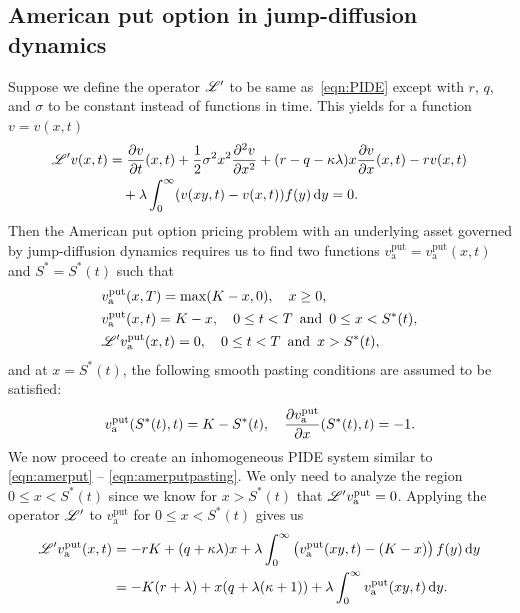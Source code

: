      \subsection{American put option in jump-diffusion dynamics}
     \label{sec:amerputJD}
     Suppose we define the operator $\mathscr L'$ to be same as~\eqref{eqn:PIDE} except with $r$, $q$, and $\sigma$ to be constant instead of functions in time. This yields for a function $v = v(x,t)$
   \begin{equation}
   	\label{eqn:PIDE2}
   	\begin{split}
   	\mathscr L'v(x,t) &= \frac{\partial v}{\partial t}(x,t) + \frac{1}{2}\sigma^2x^2\frac{\partial^2 v}{\partial x^2} + (r-q-\kappa\lambda)x\frac{\partial v}{\partial x}(x,t) - rv(x,t) \\
   	&{}\quad + \lambda\int_0^\infty (v(xy,t)-v(x,t))f(y) \, \mathrm d y = 0.
   	\end{split}
   \end{equation}
   Then the American put option pricing problem with an underlying asset governed by jump-diffusion dynamics requires us to find two functions $ v_{\text{a}}^{\text{put}} = v_{\text{a}}^{\text{put}}(x,t)$ and $S^* = S^*(t)$ such that
        \begin{equation}
        \label{eqn:amerputPIDE}
        \begin{split}
            &v_{\text{a}}^{\text{put}}(x,T) = \max(K-x,0), \quad x \geq 0, \\
            &v_{\text{a}}^{\text{put}}(x,t) = K-x, \quad 0 \leq t < T \enskip \text{and} \enskip 0 \leq x < S^*(t), \\
            &\mathscr{L'}v_{\text{a}}^{\text{put}}(x,t) = 0, \quad 0 \leq t < T \enskip \text{and} \enskip x > S^*(t),
        \end{split}
    \end{equation}
    and at $x = S^*(t)$, the following smooth pasting conditions are assumed to be satisfied:
    	\begin{equation}
    		\label{eqn:amerputPIDEsmc}
    		v_{\text{a}}^{\text{put}}(S^*(t),t) = K - S^*(t), \quad \frac{\partial v_{\text{a}}^{\text{put}}}{\partial x}(S^*(t),t) = -1.
    	\end{equation}
    	We now proceed to create an inhomogeneous PIDE system similar to \eqref{eqn:amerput} -- \eqref{eqn:amerputpasting}. We only need to analyze the region $0 \leq x < S^*(t)$ since we know for $x > S^*(t)$ that $\mathscr L' v_{\text{a}}^{\text{put}} = 0$. Applying the operator $\mathscr L'$ to $v_{\text{a}}^{\text{put}}$ for $0 \leq x < S^*(t)$ gives us
        \begin{align*}
            \mathscr L'v_{\text{a}}^{\text{put}}(x,t) &= -rK + (q+\kappa\lambda)x + \lambda\int_0^\infty \left( v_{\text{a}}^{\text{put}}(xy,t) - (K-x)\right)f(y) \, \mathrm d y \\
            &= -K(r+\lambda) + x(q + \lambda(\kappa+1)) + \lambda\int_0^\infty v_{\text{a}}^{\text{put}}(xy,t) \, \mathrm d y.
        \end{align*}

